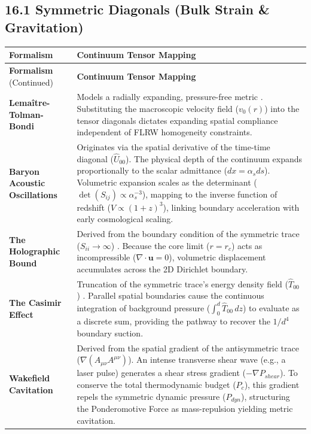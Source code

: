 \subsection*{16.1 Symmetric Diagonals (Bulk Strain \& Gravitation)}
\renewcommand{\arraystretch}{1.5}
\begin{longtable}{p{} p{}}
    \hline
    \textbf{Formalism} & \textbf{Continuum Tensor Mapping} \\
    \hline
    \endfirsthead
    \hline
    \textbf{Formalism} (Continued) & \textbf{Continuum Tensor Mapping} \\
    \hline
    \endhead
    \hline
    \endfoot
    
    \textbf{Lemaître-Tolman-Bondi} & Models a radially expanding, pressure-free metric \cite{Lemaitre1933, Tolman1934, Bondi1947}. Substituting the macroscopic velocity field ($v_0(r)$) into the tensor diagonals dictates expanding spatial compliance independent of FLRW homogeneity constraints. \\
    \textbf{Baryon Acoustic Oscillations} & Originates via the spatial derivative of the time-time diagonal ($\hat{U}_{00}$). The physical depth of the continuum expands proportionally to the scalar admittance ($dx = \alpha_s ds$). Volumetric expansion scales as the determinant ($\det(S_{ij}) \propto \alpha_s^{-3}$), mapping to the inverse function of redshift ($V \propto (1+z)^3$), linking boundary acceleration with early cosmological scaling. \\ 
    \textbf{The Holographic Bound} & Derived from the boundary condition of the symmetric trace ($S_{ii} \to \infty$) \cite{Bekenstein1973}. Because the core limit ($r=r_c$) acts as incompressible ($\nabla \cdot \mathbf{u} = 0$), volumetric displacement accumulates across the 2D Dirichlet boundary. \\ 
    \textbf{The Casimir Effect} & Truncation of the symmetric trace's energy density field ($\hat{T}_{00}$) \cite{Casimir1948}. Parallel spatial boundaries cause the continuous integration of background pressure ($\int_0^d \hat{T}_{00} \, dz$) to evaluate as a discrete sum, providing the pathway to recover the $1/d^4$ boundary suction. \\ 
    \textbf{Wakefield Cavitation} & Derived from the spatial gradient of the antisymmetric trace ($\nabla(A_{\mu\nu}A^{\mu\nu})$). An intense transverse shear wave (e.g., a laser pulse) generates a shear stress gradient ($-\nabla P_{shear}$). To conserve the total thermodynamic budget ($P_c$), this gradient repels the symmetric dynamic pressure ($P_{dyn}$), structuring the Ponderomotive Force as mass-repulsion yielding metric cavitation. \\

\end{longtable}
